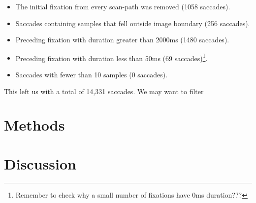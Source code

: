\documentclass[a4paper, oneside, 11pt, onecolumn]{article}
\begin{document}
\begin{itemize}
\item The initial fixation from every scan-path was removed (1058 saccades).
\item Saccades containing samples that fell outside image boundary  (256 saccades).
\item Preceding fixation with duration greater than 2000ms (1480 saccades).
\item Preceding fixation with duration less than 50ms (69 saccades)\footnote{Remember to check why a small number of fixations have 0ms duration???}.
\item Saccades with fewer than 10 samples (0 saccades).
\end{itemize}

This left us with a total of 14,331 saccades. We may want to filter

\section{Methods}



\section{Discussion}
\end{document}
